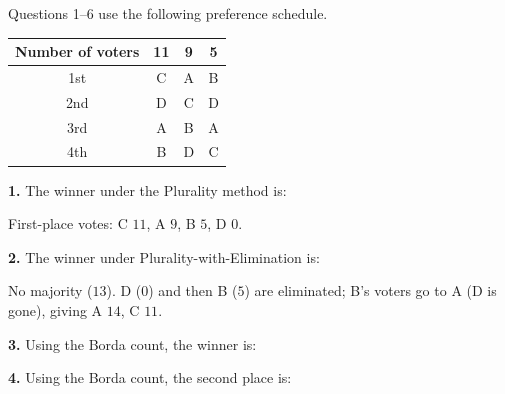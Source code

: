 \documentclass[12pt]{ximera}
\begin{document}
\begin{problem}
Questions 1--6 use the following preference schedule.
\begin{center}
\begin{tabular}{c|ccc}
Number of voters & 11 & 9 & 5\\\hline
1st & C & A & B\\
2nd & D & C & D\\
3rd & A & B & A\\
4th & B & D & C
\end{tabular}
\end{center}

\begin{prompt}
\textbf{1.} The winner under the Plurality method is:
\begin{multipleChoice}
\end{multipleChoice}
\begin{feedback}
First-place votes: C $11$, A $9$, B $5$, D $0$.
\end{feedback}
\end{prompt}

\begin{prompt}
\textbf{2.} The winner under Plurality-with-Elimination is:
\begin{multipleChoice}
\end{multipleChoice}
\begin{feedback}
No majority ($13$). D ($0$) and then B ($5$) are eliminated; B's voters go to A (D is gone), giving A $14$, C $11$.
\end{feedback}
\end{prompt}

\begin{prompt}
\textbf{3.} Using the Borda count, the winner is:
\begin{multipleChoice}
\end{multipleChoice}
\end{prompt}

\begin{prompt}
\textbf{4.} Using the Borda count, the second place is:
\begin{multipleChoice}
\end{multipleChoice}
\end{prompt}


\end{problem}
\end{document}
